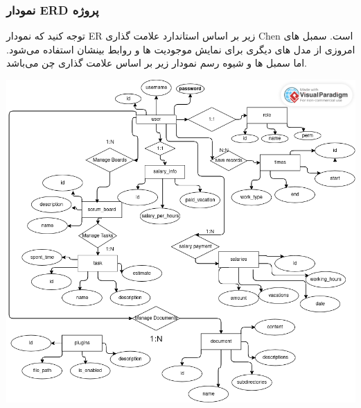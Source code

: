 \subsubsection{نمودار ERD پروژه}

توجه کنید که نمودار ER زیر بر اساس استاندارد علامت گذاری Chen است. سمبل های امروزی از مدل های دیگری برای نمایش موجودیت ها و روابط بینشان استفاده می‌شود.
اما سمبل ها و شیوه رسم نمودار زیر بر اساس علامت گذاری چن می‌باشد.

\includegraphics[scale=0.6]{assets/main_erd.png}
